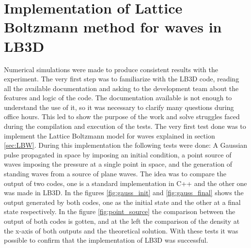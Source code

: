 \chapter{Implementation of Lattice Boltzmann method for waves in LB3D}

Numerical simulations were made to produce consistent results with the experiment. The very first step was to familiarize with the LB3D code, reading all the available documentation and asking to the development team about the features and logic of the code. The documentation available is not enough to understand the use of it, so it was necessary to clarify many questions during office hours. This led to show the purpose of the work and solve struggles faced during the compilation and execution of the tests. The very first test done was to implement the Lattice Boltzmann model for waves explained in section \ref{sec:LBW}. During this implementation the following tests were done: A Gaussian pulse propagated in space by imposing an initial condition, a point source of waves imposing the pressure at a single point in space, and the generation of standing waves from a source of plane waves. The idea was to compare the output of two codes, one is a standard implementation in C++ and the other one was made in LB3D. In the figures \ref{fig:gauss_init} and \ref{fig:gauss_final} shows the output generated by both codes, one as the initial state and the other at a final state respectively. In the figure \ref{fig:point_source} the comparison between the output of both codes is gotten, and at the left the comparison of the density at the x-axis of both outputs and the theoretical solution. With these tests it was possible to confirm that the implementation of LB3D was successful. 

